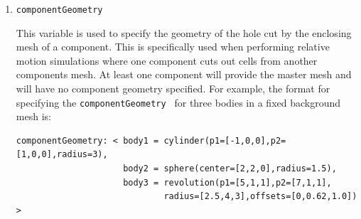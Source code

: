 \documentclass{article}
\begin{document}
\begin{enumerate}
\item {\tt componentGeometry }

  This variable is used to specify the geometry of the hole cut by the
  enclosing mesh of a component.  This is specifically used when
  performing relative motion simulations where one component cuts out
  cells from another components mesh.  At least one component will
  provide the master mesh and will have no component geometry
  specified.  For example, the format for specifying the {\tt componentGeometry }
  for three bodies in a fixed background mesh is:
\begin{verbatim}
componentGeometry: < body1 = cylinder(p1=[-1,0,0],p2=[1,0,0],radius=3),
                     body2 = sphere(center=[2,2,0],radius=1.5),
                     body3 = revolution(p1=[5,1,1],p2=[7,1,1],
                             radius=[2.5,4,3],offsets=[0,0.62,1.0]) >
\end{verbatim}
  

\end{enumerate}
\end{document}
